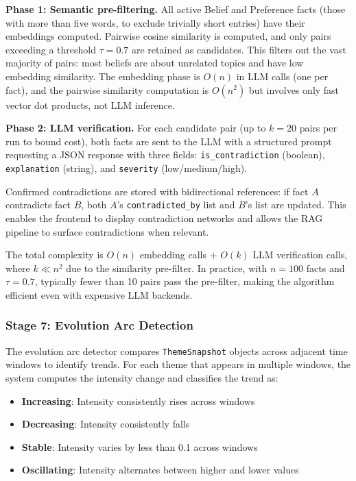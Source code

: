 \documentclass[manuscript,review]{acmart}
\begin{document}
\textbf{Phase 1: Semantic pre-filtering.}
All active Belief and Preference facts (those with more than five words, to exclude trivially short entries) have their embeddings computed.
Pairwise cosine similarity is computed, and only pairs exceeding a threshold $\tau = 0.7$ are retained as candidates.
This filters out the vast majority of pairs: most beliefs are about unrelated topics and have low embedding similarity.
The embedding phase is $O(n)$ in LLM calls (one per fact), and the pairwise similarity computation is $O(n^2)$ but involves only fast vector dot products, not LLM inference.

\textbf{Phase 2: LLM verification.}
For each candidate pair (up to $k = 20$ pairs per run to bound cost), both facts are sent to the LLM with a structured prompt requesting a JSON response with three fields: \texttt{is\_contradiction} (boolean), \texttt{explanation} (string), and \texttt{severity} (low/medium/high).

Confirmed contradictions are stored with bidirectional references: if fact $A$ contradicts fact $B$, both $A$'s \texttt{contradicted\_by} list and $B$'s list are updated.
This enables the frontend to display contradiction networks and allows the RAG pipeline to surface contradictions when relevant.

The total complexity is $O(n)$ embedding calls $+$ $O(k)$ LLM verification calls, where $k \ll n^2$ due to the similarity pre-filter.
In practice, with $n = 100$ facts and $\tau = 0.7$, typically fewer than 10 pairs pass the pre-filter, making the algorithm efficient even with expensive LLM backends.

\subsubsection{Stage 7: Evolution Arc Detection}
The evolution arc detector compares \texttt{ThemeSnapshot} objects across adjacent time windows to identify trends.
For each theme that appears in multiple windows, the system computes the intensity change and classifies the trend as:

\begin{itemize}
    \item \textbf{Increasing}: Intensity consistently rises across windows
    \item \textbf{Decreasing}: Intensity consistently falls
    \item \textbf{Stable}: Intensity varies by less than 0.1 across windows
    \item \textbf{Oscillating}: Intensity alternates between higher and lower values
\end{itemize}
\end{document}
